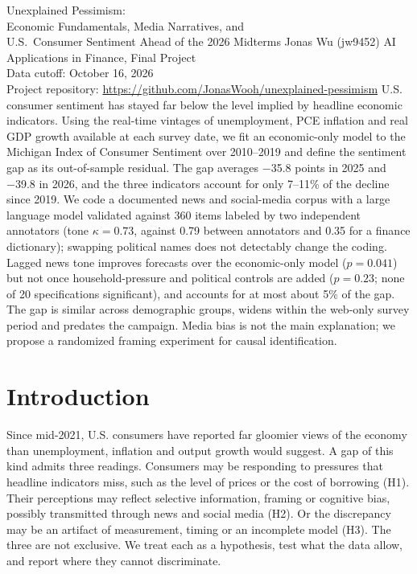 \documentclass[11pt]{article}
\newcommand{\repourl}{\url{https://github.com/JonasWooh/unexplained-pessimism}}
\begin{document}
\maketitleblock
{Unexplained Pessimism:\\Economic Fundamentals, Media Narratives, and\\U.S.\ Consumer Sentiment Ahead of the 2026 Midterms}
{Jonas Wu (jw9452)}
{AI Applications in Finance, Final Project\\Data cutoff: October 16, 2026\\Project repository: \repourl}
{U.S. consumer sentiment has stayed far below the level implied by headline economic indicators. Using the real-time vintages of unemployment, PCE inflation and real GDP growth available at each survey date, we fit an economic-only model to the Michigan Index of Consumer Sentiment over 2010–2019 and define the sentiment gap as its out-of-sample residual. The gap averages −35.8 points in 2025 and −39.8 in 2026, and the three indicators account for only 7–11\% of the decline since 2019. We code a documented news and social-media corpus with a large language model validated against 360 items labeled by two independent annotators (tone $\kappa = 0.73$, against 0.79 between annotators and 0.35 for a finance dictionary); swapping political names does not detectably change the coding. Lagged news tone improves forecasts over the economic-only model ($p = 0.041$) but not once household-pressure and political controls are added ($p = 0.23$; none of 20 specifications significant), and accounts for at most about 5\% of the gap. The gap is similar across demographic groups, widens within the web-only survey period and predates the campaign. Media bias is not the main explanation; we propose a randomized framing experiment for causal identification.}

\section{Introduction}\label{sec:intro}

Since mid-2021, U.S. consumers have reported far gloomier views of the economy than unemployment, inflation and output growth would suggest. A gap of this kind admits three readings. Consumers may be responding to pressures that headline indicators miss, such as the level of prices or the cost of borrowing (H1). Their perceptions may reflect selective information, framing or cognitive bias, possibly transmitted through news and social media (H2). Or the discrepancy may be an artifact of measurement, timing or an incomplete model (H3). The three are not exclusive. We treat each as a hypothesis, test what the data allow, and report where they cannot discriminate.
\end{document}

